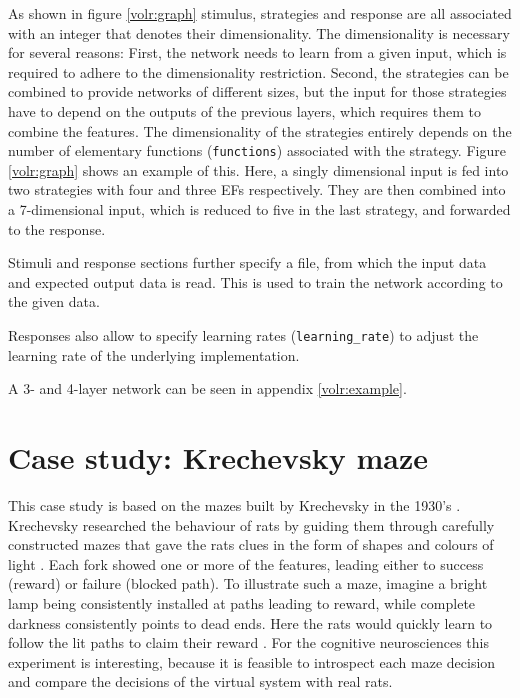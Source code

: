 \documentclass[a4paper,oneside]{memoir}
\begin{document}
As shown in figure \ref{volr:graph} stimulus, strategies and response are
all associated with an integer that denotes their dimensionality.
The dimensionality is necessary for several reasons:
First, the network needs to learn from a given input, which is
required to adhere to the dimensionality restriction.
Second, the strategies can be combined to provide
networks of different sizes, but the input for those strategies have to
depend on the outputs of the previous layers, which requires them to combine
the features.
The dimensionality of the strategies entirely depends on the number of
elementary functions (\texttt{functions}) associated with the strategy.
Figure \ref{volr:graph} shows an example of this. Here, a singly dimensional
input is fed into two strategies with four and three EFs respectively. They are
then combined into a 7-dimensional input, which is reduced to five in the last
strategy, and forwarded to the response.

Stimuli and response sections further specify a file, from which the input data
and expected output data is read. This is used to train the network according
to the given data.

Responses also allow to specify learning rates (\texttt{learning\_rate}) to
adjust the learning rate of the underlying implementation.

A 3- and 4-layer network can be seen in appendix \ref{volr:example}.

{\let\clearpage\relax\chapter{Case study: Krechevsky maze}}
\label{case}

This case study is based on the mazes built by Krechevsky in the
1930's \autocite{Krechevsky1932}. Krechevsky researched the behaviour of
rats by guiding them through carefully constructed mazes that gave the rats
clues in the form of shapes and colours of light \autocite{Krechevsky1932}. Each
fork showed one or more of the features, leading either to success (reward)
or failure (blocked path). To illustrate such a maze, imagine a bright lamp
being consistently installed at paths leading to reward, while complete
darkness consistently points to dead ends. Here the rats would quickly learn
to follow the lit paths to claim their reward \autocite{Krechevsky1932}.
For the cognitive neurosciences this experiment is interesting, because it is
feasible to introspect each maze decision and compare the decisions of the
virtual system with real rats.
\end{document}
